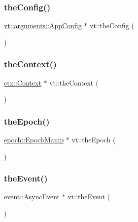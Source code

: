 \subsubsection{\texorpdfstring{the\+Config()}{theConfig()}}
{\footnotesize\ttfamily \hyperlink{structvt_1_1arguments_1_1_app_config}{vt\+::arguments\+::\+App\+Config} $\ast$ vt\+::the\+Config (\begin{DoxyParamCaption}{ }\end{DoxyParamCaption})}

\mbox{\label{namespacevt_a26551fe0e6e6a1371111df5b12c7e92c}} 
\subsubsection{\texorpdfstring{the\+Context()}{theContext()}}
{\footnotesize\ttfamily \hyperlink{structvt_1_1ctx_1_1_context}{ctx\+::\+Context} $\ast$ vt\+::the\+Context (\begin{DoxyParamCaption}{ }\end{DoxyParamCaption})}

\mbox{\label{namespacevt_ad246530e523687095c567ccab203556a}} 
\subsubsection{\texorpdfstring{the\+Epoch()}{theEpoch()}}
{\footnotesize\ttfamily \hyperlink{structvt_1_1epoch_1_1_epoch_manip}{epoch\+::\+Epoch\+Manip} $\ast$ vt\+::the\+Epoch (\begin{DoxyParamCaption}{ }\end{DoxyParamCaption})}

\mbox{\label{namespacevt_aa297fcaadc8a330890eb90c5b0081ec5}} 
\subsubsection{\texorpdfstring{the\+Event()}{theEvent()}}
{\footnotesize\ttfamily \hyperlink{structvt_1_1event_1_1_async_event}{event\+::\+Async\+Event} $\ast$ vt\+::the\+Event (\begin{DoxyParamCaption}{ }\end{DoxyParamCaption})}

